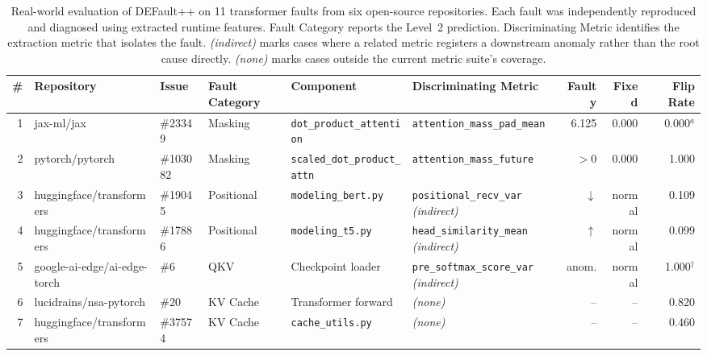\begin{table}[!htbp]
\centering
\caption[Real-world fault detection and diagnosis results.]{Real-world evaluation of DEFault++ on 11 transformer faults from six open-source repositories. Each fault was independently reproduced and diagnosed using extracted runtime features. Fault Category reports the Level~2 prediction. Discriminating Metric identifies the extraction metric that isolates the fault. \emph{(indirect)} marks cases where a related metric registers a downstream anomaly rather than the root cause directly. \emph{(none)} marks cases outside the current metric suite's coverage.}
\label{tab:realworld_eval}
\renewcommand{\arraystretch}{1.15}
\footnotesize
\begin{tabular}{@{}r l l l l p{3.6cm} r r r@{}}
\toprule
\textbf{\#} &
\textbf{Repository} &
\textbf{Issue} &
\textbf{Fault Category} &
\textbf{Component} &
\textbf{Discriminating Metric} &
\textbf{Faulty} &
\textbf{Fixed} &
\textbf{Flip Rate} \\
\midrule

1 & jax-ml/jax & \#23349
  & Masking
  & \texttt{dot\_product\_attention}
  & \texttt{attention\_mass\_pad\_mean}
  & 6.125 & 0.000 & 0.000$^{a}$ \\

2 & pytorch/pytorch & \#103082
  & Masking
  & \texttt{scaled\_dot\_product\_attn}
  & \texttt{attention\_mass\_future}
  & $>$0 & 0.000 & 1.000 \\

3 & huggingface/transformers & \#19045
  & Positional
  & \texttt{modeling\_bert.py}
  & \texttt{positional\_recv\_var} \emph{(indirect)}
  & $\downarrow$ & normal & 0.109 \\

4 & huggingface/transformers & \#17886
  & Positional
  & \texttt{modeling\_t5.py}
  & \texttt{head\_similarity\_mean} \emph{(indirect)}
  & $\uparrow$ & normal & 0.099 \\

5 & google-ai-edge/ai-edge-torch & \#6
  & QKV
  & Checkpoint loader
  & \texttt{pre\_softmax\_score\_var} \emph{(indirect)}
  & anom. & normal & 1.000$^\dagger$ \\

6 & lucidrains/nsa-pytorch & \#20
  & KV Cache
  & Transformer forward
  & \emph{(none)}
  & -- & -- & 0.820 \\

7 & huggingface/transformers & \#37574
  & KV Cache
  & \texttt{cache\_utils.py}
  & \emph{(none)}
  & -- & -- & 0.460 \\


\end{tabular}
\end{table}
